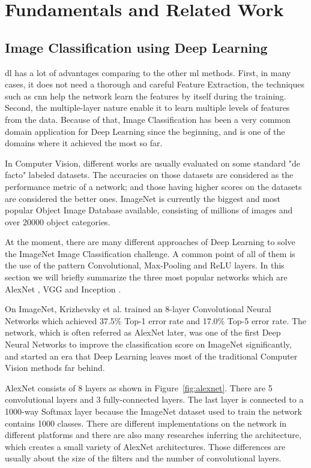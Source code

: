 \chapter{Fundamentals and Related Work\label{cha:relatedwork}}

\section{Image Classification using Deep Learning}

\acrfull{dl} has a lot of advantages comparing to the other \acrshort{ml} methods. First,
in many cases, it does not need a thorough and careful Feature Extraction, the techniques
such as \acrshort{cnn} help the network learn the features by itself during the training.
Second, the multiple-layer nature enable it to learn multiple levels of features from the
data. Because of that, Image Classification has been a very common domain application for
Deep Learning since the beginning, and is one of the domains where it achieved the most so
far. 

In Computer Vision, different works are usually evaluated on some standard "de facto"
labeled datasets. The accuracies on those datasets are considered as the performance
metric of a network; and those having higher scores on the datasets are considered the
better ones. ImageNet \cite{imagenet} is currently the biggest and most popular Object
Image Database available, consisting of millions of images and over 20000 object
categories. 

At the moment, there are many different approaches of Deep Learning to solve the ImageNet
Image Classification challenge. A common point of all of them is the use of the pattern
Convolutional, Max-Pooling and ReLU layers. In this section we will briefly summarize the three most
popular networks which are AlexNet \cite{alexnet}, VGG \cite{vgg} and Inception
\cite{inception1, inception2, inception3}.

On ImageNet, Krizhevsky et al. \cite{alexnet} trained an 8-layer Convolutional Neural
Networks which achieved 37.5\% Top-1 error rate and 17.0\% Top-5 error rate. The network,
which is often referred as AlexNet later, was one of the first Deep Neural Networks to
improve the classification score on ImageNet significantly, and started an era that Deep
Learning leaves most of the traditional Computer Vision methods far behind. 

AlexNet consists of 8 layers as shown in Figure~\ref{fig:alexnet}. There are 5
convolutional layers and 3 fully-connected layers. The last layer is connected to a
1000-way Softmax layer because the ImageNet dataset \cite{imagenet} used to train the
network contains 1000 classes. There are different implementations on the network in
different platforms and there are also many researches inferring the architecture, which
creates a small variety of AlexNet architectures. Those differences are usually about the
size of the filters and the number of convolutional layers.

